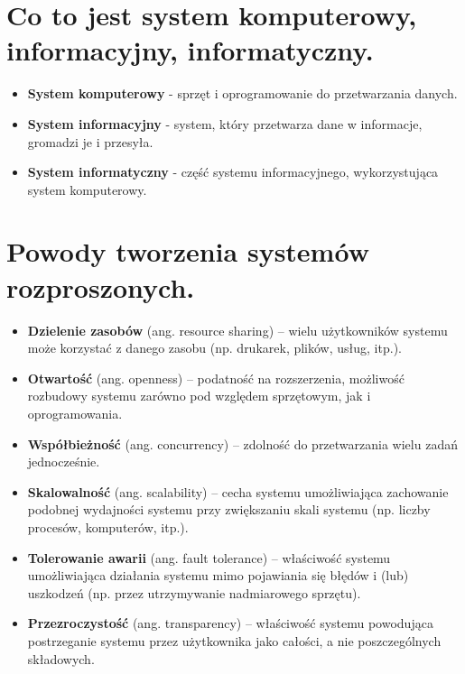 \documentclass[12pt,a4paper]{article}
\begin{document}
	\section{Co to jest system komputerowy, informacyjny, informatyczny.}
	\begin{itemize}	
		\item \textbf{System komputerowy} - sprzęt i oprogramowanie do przetwarzania danych. 
		\item \textbf{System informacyjny} - system, który przetwarza dane w informacje, gromadzi je i przesyła. 
		\item \textbf{System informatyczny} - część systemu informacyjnego, wykorzystująca system komputerowy.
	\end{itemize}

	\section{Powody tworzenia systemów rozproszonych.}
	\begin{itemize}
		\item \textbf{Dzielenie zasobów} (ang. resource sharing) – wielu użytkowników systemu może korzystać z danego zasobu (np. drukarek, plików, usług, itp.).
		
		\item \textbf{Otwartość} (ang. openness) – podatność na rozszerzenia, możliwość rozbudowy systemu zarówno pod względem sprzętowym, jak i oprogramowania.
		
		\item \textbf{Współbieżność} (ang. concurrency) – zdolność do przetwarzania wielu zadań jednocześnie.
		
		\item \textbf{Skalowalność} (ang. scalability) – cecha systemu umożliwiająca zachowanie podobnej wydajności systemu przy zwiększaniu skali systemu (np. liczby procesów, komputerów, itp.).
		
		\item \textbf{Tolerowanie awarii} (ang. fault tolerance) – właściwość systemu umożliwiająca działania systemu mimo pojawiania się błędów i (lub) uszkodzeń (np. przez utrzymywanie nadmiarowego sprzętu).
		
		\item \textbf{Przezroczystość} (ang. transparency) – właściwość systemu powodująca postrzeganie systemu przez użytkownika jako całości, a nie poszczególnych składowych.
	\end{itemize}
\end{document}
